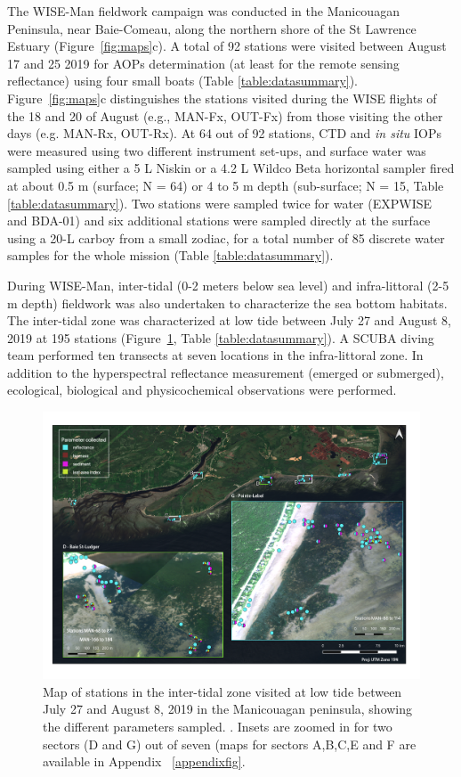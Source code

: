 \documentclass[essd, manuscript]{copernicus}
\begin{document}
The WISE-Man fieldwork campaign was conducted in the Manicouagan Peninsula, near Baie-Comeau, along the northern shore of the St Lawrence Estuary (Figure~\ref{fig:maps}c). A total of 92 stations were visited between August 17 and 25 2019 for AOPs determination (at least for the remote sensing reflectance) using four small boats (Table \ref{table:datasummary}). Figure~\ref{fig:maps}c distinguishes the stations visited during the WISE flights of the 18 and 20 of August (e.g., MAN-Fx, OUT-Fx) from those visiting the other days (e.g. MAN-Rx, OUT-Rx). At 64 out of 92 stations, CTD and \textit{in situ} IOPs were measured using two different instrument set-ups, and surface water was sampled using either a 5 L Niskin or a 4.2 L Wildco Beta horizontal sampler fired at about 0.5 m (surface; N = 64) or 4 to 5 m depth (sub-surface; N = 15, Table \ref{table:datasummary}). Two stations were sampled twice for water (EXPWISE and BDA-01) and six additional stations were sampled directly at the surface using a 20-L carboy from a small zodiac, for a total number of 85 discrete water samples for the whole mission (Table \ref{table:datasummary}). 
 
During WISE-Man, inter-tidal (0-2 meters below sea level) and infra-littoral (2-5 m depth) fieldwork was also undertaken to characterize the sea bottom habitats. The inter-tidal zone was characterized at low tide between July 27 and August 8, 2019 at  195 stations (Figure~\ref{fig:intertidal}, Table \ref{table:datasummary}). A SCUBA diving team performed ten transects at seven locations in the infra-littoral zone.  In addition to the hyperspectral reflectance measurement (emerged or submerged), ecological, biological and physicochemical observations were performed.  

\begin{figure}
    \centering
    \includegraphics[width=18cm]{Figures/Fig2_intertidal_v3.png}
    \caption{Map of stations in the inter-tidal zone visited at low tide between July 27 and August 8, 2019 in the Manicouagan peninsula, showing the different parameters sampled. . Insets are zoomed in for two sectors (D and G) out of seven (maps for sectors A,B,C,E and F are available in Appendix ~\ref{appendixfig}. }
    \label{fig:intertidal}
\end{figure}
\end{document}
